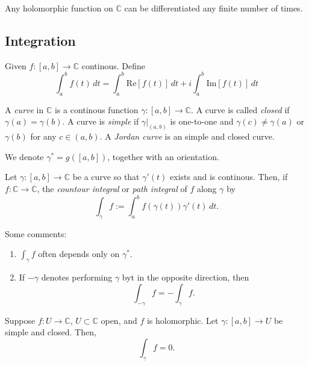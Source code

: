
\begin{thm}
	Any holomorphic function on $\mathbb{C}$ can be differentiated any finite number of times.
\end{thm}

\subsection{Integration}

\begin{defn}
	Given $f: [a, b] \to \mathbb{C}$ continous. Define \[
		\int_a^b f(t) \,d{t} = \int_a^b \mathrm{Re}[f(t)] \,dt + i \int_a^b \mathrm{Im}[f(t)] \,dt
	\]
\end{defn}

\begin{defn}[Curve]
	A \emph{curve} in $\mathbb{C}$ is a continous function $\gamma: [a, b] \to \mathbb{C}$. A curve is called \emph{closed} if $\gamma(a) = \gamma(b)$. A curve is \emph{simple} if $\gamma\big|_{(a, b)}$ is one-to-one and $\gamma(c) \neq \gamma(a)$ or $\gamma(b)$ for any $c \in (a, b)$. A \emph{Jordan curve} is an simple and closed curve.

	We denote $\gamma^* = g([a, b])$, together with an orientation.
\end{defn}

\begin{defn}
	Let $\gamma: [a, b] \to \mathbb{C}$ be a curve so that $\gamma'(t)$ exists and is continous.
	Then, if  $f: \mathbb{C} \to \mathbb{C}$, the \emph{countour integral} or \emph{path integral} of $f$ along $\gamma$ by \[
		\int_\gamma f := \int_a^b f(\gamma(t)) \gamma'(t) \,dt.
	\]
\end{defn}

Some comments:
\begin{enumerate}
	\item $\int_\gamma f$ often depends only on $\gamma^*$.
	\item If $-\gamma$ denotes performing $\gamma$ byt in the opposite direction, then \[
			\int_{-\gamma} f = -\int_{\gamma} f.
	\]
\end{enumerate}

\begin{thm}
	Suppose $f: U \to \mathbb{C}$, $U \subset \mathbb{C}$ open, and $f$ is holomorphic. Let $\gamma: [a, b] \to U$ be simple and closed. Then, \[
		\int_\gamma f = 0.
	\]
\end{thm}

